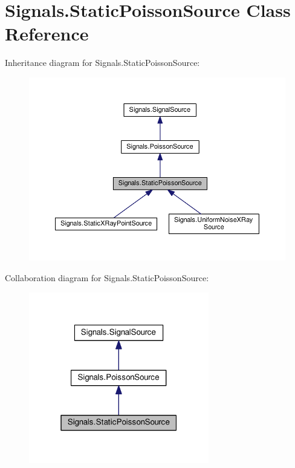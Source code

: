 \hypertarget{classSignals_1_1StaticPoissonSource}{}\section{Signals.\+Static\+Poisson\+Source Class Reference}
\label{classSignals_1_1StaticPoissonSource}


Inheritance diagram for Signals.\+Static\+Poisson\+Source\+:\nopagebreak
\begin{figure}[H]
\begin{center}
\leavevmode
\includegraphics[width=350pt]{classSignals_1_1StaticPoissonSource__inherit__graph}
\end{center}
\end{figure}


Collaboration diagram for Signals.\+Static\+Poisson\+Source\+:\nopagebreak
\begin{figure}[H]
\begin{center}
\leavevmode
\includegraphics[width=223pt]{classSignals_1_1StaticPoissonSource__coll__graph}
\end{center}
\end{figure}
